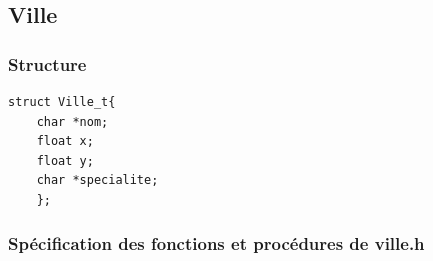 \documentclass[a4paper, 11pt, oneside]{article}
\begin{document}
\subsection{\textbf{Ville}}
\subsubsection{Structure}
\begin{lstlisting}[caption = {Structure "Ville"}]
    struct Ville_t{
    char *nom;
    float x;
    float y;
    char *specialite;
    };
\end{lstlisting}

\subsubsection{Spécification des fonctions et procédures de ville.h}
\end{document}
